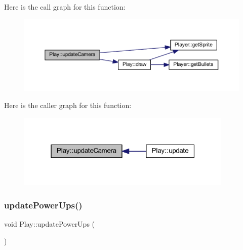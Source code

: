 Here is the call graph for this function\+:
\nopagebreak
\begin{figure}[H]
\begin{center}
\leavevmode
\includegraphics[width=350pt]{class_play_a321efb6f8d02dc3695404b33c22e9285_cgraph}
\end{center}
\end{figure}
Here is the caller graph for this function\+:
\nopagebreak
\begin{figure}[H]
\begin{center}
\leavevmode
\includegraphics[width=292pt]{class_play_a321efb6f8d02dc3695404b33c22e9285_icgraph}
\end{center}
\end{figure}
\mbox{\label{class_play_aa4cf498ba0e0f0d05305d749bd753137}} 
\subsubsection{\texorpdfstring{update\+Power\+Ups()}{updatePowerUps()}}
{\footnotesize\ttfamily void Play\+::update\+Power\+Ups (\begin{DoxyParamCaption}{ }\end{DoxyParamCaption})}

